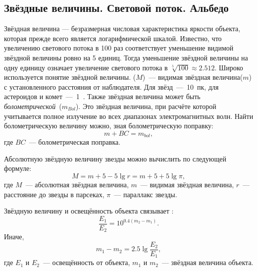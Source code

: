 \subsection{Звёздные величины. Световой поток. Альбедо}

Звёздная величина --- безразмерная числовая характеристика яркости объекта, которая прежде всего является логарифмической шкалой. Известно, что увеличению светового потока в 100 раз соответствует уменьшение видимой звёздной величины ровно на 5 единиц. Тогда уменьшение звёздной величины на одну единицу означает увеличение светового потока в $\sqrt[5]{100}\approx 2.512$. Широко используется понятие  звёздной величины.  ($M$)~--- видимая звёздная величина($m$) с установленного расстояния от наблюдателя. Для звёзд~---~10~пк, для астероидов и комет~---~1~\au. Также звёздная величина может быть \textit{болометрической}~($m_{Bol}$). Это звёздная величина, при расчёте которой учитывается полное излучение во всех диапазонах электромагнитных волн. Найти болометрическую величину можно, зная болометрическую поправку:
\begin{equation}
	m + BC = m_{bol},
\end{equation}
где $BC$~--- болометрическая поправка.

Абсолютную звёздную величину звезды можно вычислить по следующей формуле:
\begin{equation}
	M = m + 5 - 5\lg r = m + 5 + 5 \lg \pi,
\end{equation}
где $M$~--- абсолютная звёздная величина, $m$~--- видимая звёздная величина, $r$~--- расстояние до звезды в парсеках, $\pi$~--- параллакс звезды.

Звёздную величину и освещённость объекта связывает :
\begin{equation}
	\frac{E_1}{E_2} = 10^{0.4(m_2 - m_1)}.
\end{equation}
Иначе,
\begin{equation}
m_1 - m_2 = 2.5 \lg \frac{E_2}{E_1},
\end{equation}
где $E_1$ и $E_2$~--- освещённость от объекта, $m_1$ и $m_2$~--- звёздная величина объекта.
